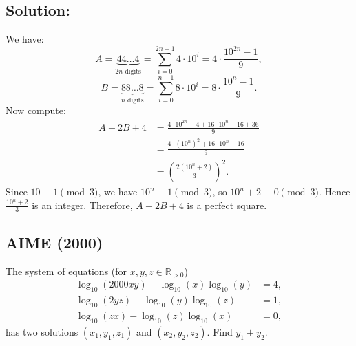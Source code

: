 \begin{solution}
    \subsection*{Solution:} We have:
    \[
        A = \underbrace{44\ldots4}_{2n \text{ digits}} = \sum_{i=0}^{2n-1} 4 \cdot 10^{i} = 4 \cdot \frac{10^{2n} - 1}{9},
    \]
    \[
        B = \underbrace{88\ldots8}_{n \text{ digits}} = \sum_{i=0}^{n-1} 8 \cdot 10^{i} = 8 \cdot \frac{10^n - 1}{9}.
    \]
    Now compute:
    \begin{align*} A+2B+4 &= \frac{4 \cdot 10^{2n} - 4 + 16 \cdot 10^n - 16 + 36}{9} \\ &=
        \frac{4 \cdot (10^n)^2 + 16 \cdot 10^n + 16}{9} \\ &= \left(\frac{2(10^n + 2)}{3}\right)^2.
    \end{align*}
    Since \( 10 \equiv 1 \pmod{3} \), we have \( 10^n \equiv 1 \pmod{3} \), so \( 10^n + 2 \equiv 0 \pmod{3} \). Hence \( \frac{10^n + 2}{3} \) is an integer. Therefore, \( A + 2B + 4 \) is a perfect square. \subsection{AIME (2000)} The system of equations (for \( x, y, z \in \mathbb{R}_{>0} \))
    \begin{align*}
        \log_{10}\left(2000xy\right) - \log_{10}\left(x\right)\log_{10}\left(y\right) &= 4, \\
        \log_{10}\left(2yz\right) - \log_{10}\left(y\right)\log_{10}\left(z\right) &= 1, \\
        \log_{10}\left(zx\right) - \log_{10}\left(z\right)\log_{10}\left(x\right) &= 0,
    \end{align*}
    has two solutions \( \left(x_{1}, y_{1}, z_{1}\right) \) and \( \left(x_{2}, y_{2}, z_{2}\right) \). Find \( y_{1} + y_{2} \).


\end{solution}
